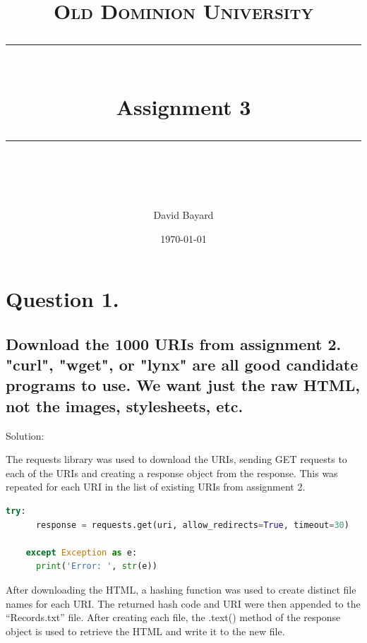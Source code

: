 \documentclass[11pt]{scrartcl} %
\title{
	\normalfont\normalsize
	\textsc{Old Dominion University}\\ %
	\vspace{25pt} %
	\rule{\linewidth}{0.5pt}\\ %
	\vspace{20pt} %
	{\huge Assignment 3}\\ %
	\vspace{12pt} %
	\rule{\linewidth}{2pt}\\ %
	\vspace{12pt} %
}
\author{\LARGE David Bayard} %
\date{\normalsize\today} %
\begin{document}

\lstset{style=pythonStyle}


\maketitle %

\pagebreak
\section*{Question 1.}




\subsection*{Download the 1000 URIs from assignment 2.  "curl", "wget", or
"lynx" are all good candidate programs to use.  We want just the
raw HTML, not the images, stylesheets, etc.}
\bigskip\bigskip


\LARGE Solution:
\newline \newline\small

\tabto{2.0cm} The requests library was used to download the URIs, sending GET requests to each of the URIs and creating a response object from the response. This was repeated for each URI in the list of existing URIs from assignment 2. 

\begin{lstlisting}[language = Python, caption=Download HTML]
   try:
      response = requests.get(uri, allow_redirects=True, timeout=30)

    except Exception as e:
      print('Error: ', str(e))
\end{lstlisting} \bigskip 

\tabto{2.0cm} After downloading the HTML, a hashing function was used to create distinct file names for each URI. The returned hash code and URI were then appended to the ``Records.txt'' file. After creating each file, the .text() method of the response object is used to retrieve the HTML and write it to the new file.
\end{document}
